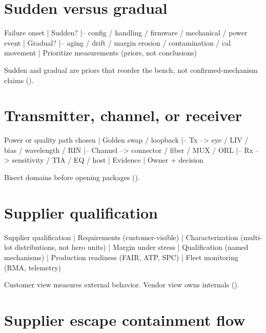 \section{Sudden versus gradual}
\label{sec:tree-time-behavior}

\begin{dectree}
Failure onset
  |
Sudden?
  |-- config / handling / firmware / mechanical / power event
  |
Gradual?
  |-- aging / drift / margin erosion / contamination / cal movement
  |
Prioritize measurements (priors, not conclusions)
\end{dectree}

Sudden and gradual are priors that reorder the bench, not confirmed-mechanism
claims ().

\section{Transmitter, channel, or receiver}
\label{sec:tree-tx-channel-rx}

\begin{dectree}
Power or quality path chosen
  |
Golden swap / loopback
  |-- Tx --> eye / LIV / bias / wavelength / RIN
  |-- Channel --> connector / fiber / MUX / ORL
  |-- Rx --> sensitivity / TIA / EQ / host
  |
Evidence
  |
Owner + decision
\end{dectree}

Bisect domains before opening packages ().

\section{Supplier qualification}
\label{sec:tree-supplier}

\begin{dectree}
Supplier qualification
  |
Requirements (customer-visible)
  |
Characterization (multi-lot distributions, not hero units)
  |
Margin under stress
  |
Qualification (named mechanisms)
  |
Production readiness (FAIR, ATP, SPC)
  |
Fleet monitoring (RMA, telemetry)
\end{dectree}

Customer view measures external behavior. Vendor view owns internals
().

\section{Supplier escape containment flow}
\label{sec:tree-escape}

